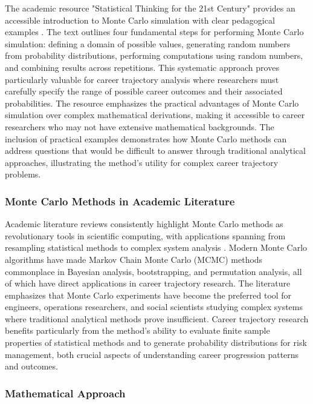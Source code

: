 \documentclass[main.tex]{subfiles}
\begin{document}
The academic resource "Statistical Thinking for the 21st Century" provides an accessible introduction to Monte Carlo simulation with clear pedagogical examples \parencite{poldrack2022}. The text outlines four fundamental steps for performing Monte Carlo simulation: defining a domain of possible values, generating random numbers from probability distributions, performing computations using random numbers, and combining results across repetitions. This systematic approach proves particularly valuable for career trajectory analysis where researchers must carefully specify the range of possible career outcomes and their associated probabilities. The resource emphasizes the practical advantages of Monte Carlo simulation over complex mathematical derivations, making it accessible to career researchers who may not have extensive mathematical backgrounds. The inclusion of practical examples demonstrates how Monte Carlo methods can address questions that would be difficult to answer through traditional analytical approaches, illustrating the method's utility for complex career trajectory problems.

\subsubsection{Monte Carlo Methods in Academic Literature}

Academic literature reviews consistently highlight Monte Carlo methods as revolutionary tools in scientific computing, with applications spanning from resampling statistical methods to complex system analysis \parencite{fishman2006}. Modern Monte Carlo algorithms have made Markov Chain Monte Carlo (MCMC) methods commonplace in Bayesian analysis, bootstrapping, and permutation analysis, all of which have direct applications in career trajectory research. The literature emphasizes that Monte Carlo experiments have become the preferred tool for engineers, operations researchers, and social scientists studying complex systems where traditional analytical methods prove insufficient. Career trajectory research benefits particularly from the method's ability to evaluate finite sample properties of statistical methods and to generate probability distributions for risk management, both crucial aspects of understanding career progression patterns and outcomes.

\subsubsection{Mathematical Approach}
\end{document}
